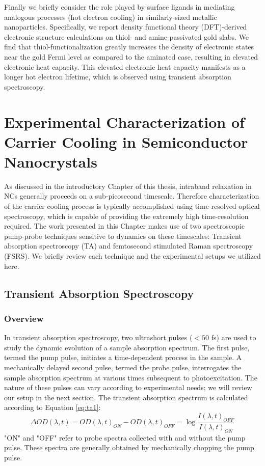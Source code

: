 Finally we briefly consider the role played by surface ligands in mediating analogous processes (hot electron cooling) in similarly-sized metallic nanoparticles. Specifically, we report density functional theory (DFT)-derived electronic structure calculations on thiol- and amine-passivated gold slabs. We find that thiol-functionalization greatly increases the density of electronic states near the gold Fermi level as compared to the aminated case, resulting in elevated electronic heat capacity. This elevated electronic heat capacity manifests as a longer hot electron lifetime, which is observed using transient absorption spectroscopy.

\section{Experimental Characterization of Carrier Cooling in Semiconductor Nanocrystals}

As discussed in the introductory Chapter of this thesis, intraband relaxation in NCs generally proceeds on a sub-picosecond timescale. Therefore characterization of the carrier cooling process is typically accomplished using time-resolved optical spectroscopy, which is capable of providing the extremely high time-resolution required. The work presented in this Chapter makes use of two spectroscopic pump-probe techniques sensitive to dynamics on these timescales: Transient absorption spectroscopy (TA) and femtosecond stimulated Raman spectroscopy (FSRS). We briefly review each technique and the experimental setups we utilized here.

\subsection{Transient Absorption Spectroscopy}
\subsubsection{Overview}
In transient absorption spectroscopy, two ultrashort pulses ($< 50$ fs) are used to study the dynamic evolution of a sample absorption spectrum. The first pulse, termed the pump pulse, initiates a time-dependent process in the sample. A mechanically delayed second pulse, termed the probe pulse, interrogates the sample absorption spectrum at various times subsequent to photoexcitation. The nature of these pulses can vary according to experimental needs; we will review our setup in the next section. The transient absorption spectrum is calculated according to Equation \ref{eq:ta1}:
\begin{equation}\label{eq:ta1}
\Delta OD(\lambda, t) = OD(\lambda, t)_{ON} - OD(\lambda, t)_{OFF} = \log{\frac{I(\lambda, t)_{OFF}}{I(\lambda,t)_{ON}}}
\end{equation}
"ON" and "OFF" refer to probe spectra collected with and without the pump pulse.  These spectra are generally obtained by mechanically chopping the pump pulse.
